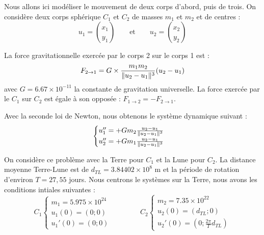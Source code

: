 		Nous allons ici modéliser le mouvement de deux corps d'abord, puis de trois.
		On considère deux corps sphérique $C_1$ et $C_2$ de masses $m_1$ et $m_2$ et de centres :
		\begin{equation}
			\label{eq-3-centreCorps}
			u_1 = \binom{x_1}{y_1} \qquad \text{et} \qquad u_2 = \binom{x_2}{y_2}
		\end{equation}

		La force gravitationnelle exercée par le corps 2 sur le corps 1 est :
		\begin{equation}
			F_{2\to1} = G \times \frac{m_1 m_2}{\lVert u_2 - u_1 \rVert^3}(u_2 - u_1)			
		\end{equation}
		avec $G = 6.67 \times 10^{-11}$ la constante de gravitation universelle. La force exercée par le $C_1$ sur $C_2$ est égale à son opposée : $F_{1\to2} = - F_{2\to1}$.

		Avec la seconde loi de Newton, nous obtenons le système dynamique suivant :
		\begin{equation}
			\label{eq-3-gravit2}
			\begin{cases}
				u_1'' = +G m_2 \frac{u_2-u_1}{\lVert u_2-u_1 \rVert^3}		\\
				u_2'' = +G m_1 \frac{u_2-u_1}{\lVert u_2-u_1 \rVert^3}		\\
			\end{cases}
		\end{equation}

		On considère ce problème avec la Terre pour $C_1$ et la Lune pour $C_2$. La distance moyenne Terre-Lune est de $d_{TL} = 3.84402\times10^8$ m et la période de rotation d'environ $T = 27,55$ jours. Nous centrons le systèmes sur la Terre, nous avons les conditions intiales suivantes :
		\begin{equation}
			\label{eq-3-condIni2}
			C_1
			\begin{cases}
				m_1 = 5.975\times10^{24}			\\
				u_1(0) = (0 ; 0)					\\
				u_1'(0) = (0; 0)				
			\end{cases}			
			\qquad\qquad
			C_2
			\begin{cases}			
				m_2 = 7.35\times10^{22}				\\
				u_2(0) = (d_{TL}; 0)				\\
				u_2'(0) = (0; \frac{2\pi}{T}d_{TL}) 
			\end{cases}			
		\end{equation}

